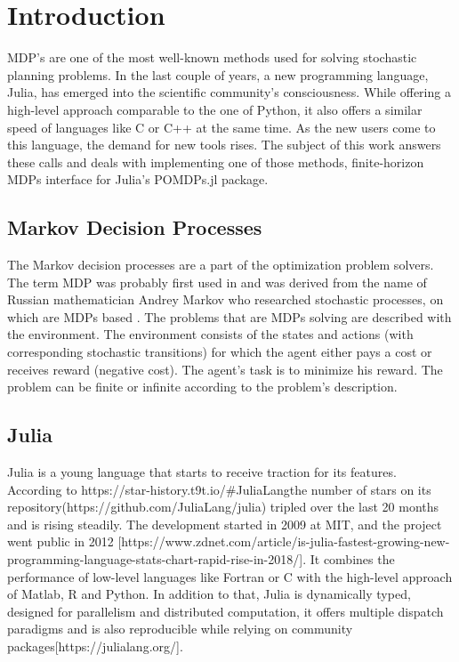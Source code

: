 
\chapter{Introduction}

MDP's are one of the most well-known methods used for solving stochastic planning problems. In the last couple of years, a new programming language, Julia, has emerged into the scientific community's consciousness. While offering a high-level approach comparable to the one of Python, it also offers a similar speed of languages like C or C++ at the same time. As the new users come to this language, the demand for new tools rises. The subject of this work answers these calls and deals with implementing one of those methods, finite-horizon MDPs interface for Julia's POMDPs.jl package.

\section{Markov Decision Processes}
The Markov decision processes are a part of the optimization problem solvers.
The term MDP was probably first used in \cite{cite:1} and was derived from the name of Russian mathematician Andrey Markov who researched stochastic processes, on which are MDPs based \cite{wiki:1}.
The problems that are MDPs solving are described with the environment. The environment consists of the states and actions (with corresponding stochastic transitions) for which the agent either pays a cost or receives reward (negative cost). The agent's task is to minimize his reward. The problem can be finite or infinite according to the problem's description.

\section{Julia}
Julia is a young language that starts to receive traction for its features. According to https://star-history.t9t.io/#JuliaLang\julia the number of stars on its repository(https://github.com/JuliaLang/julia) tripled over the last 20 months and is rising steadily.
The development started in 2009 at MIT, and the project went public in 2012 [https://www.zdnet.com/article/is-julia-fastest-growing-new-programming-language-stats-chart-rapid-rise-in-2018/]. 
It combines the performance of low-level languages like Fortran or C with the high-level approach of Matlab, R and Python. In addition to that, Julia is dynamically typed, designed for parallelism and distributed computation, it offers multiple dispatch paradigms and is also reproducible while relying on community packages[https://julialang.org/].


